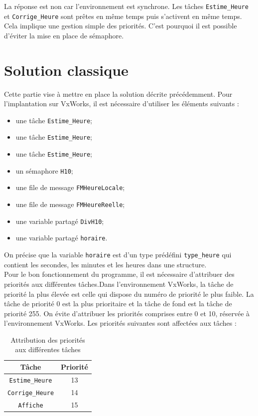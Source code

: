 \documentclass[french]{article}
\begin{document}
	La réponse est non car l'environnement est synchrone. Les tâches \texttt{Estime\_Heure} et \texttt{Corrige\_Heure} sont prêtes en même temps puis s'activent en même temps. Cela implique une gestion simple des priorités. C'est pourquoi il est possible d'éviter la mise en place de sémaphore.\\
	
	
	
	\section{Solution classique}
	
	Cette partie vise à mettre en place la solution décrite précédemment. Pour l'implantation sur VxWorks, il est nécessaire d'utiliser les éléments suivants :
	\begin{itemize}
		\item une tâche \texttt{Estime\_Heure};
		\item une tâche \texttt{Estime\_Heure};
		\item une tâche \texttt{Estime\_Heure};
		\item un sémaphore \texttt{H10};
		\item une file de message \texttt{FMHeureLocale};
		\item une file de message \texttt{FMHeureReelle};
		\item une variable partagé \texttt{DivH10};
		\item une variable partagé \texttt{horaire}.		
	\end{itemize}
	
	On précise que la variable \texttt{horaire} est d'un type prédéfini \texttt{type\_heure} qui contient les secondes, les minutes et les heures dans une structure.\\
	
	Pour le bon fonctionnement du programme, il est nécessaire d'attribuer des priorités aux différentes tâches.Dans l’environnement	VxWorks, la tâche de priorité la plus élevée est celle qui dispose du numéro de priorité le plus faible. La tâche de priorité 0 est la plus prioritaire et la tâche de fond est la tâche de priorité 255. On évite d’attribuer les priorités comprises entre 0 et 10, réservée à l’environnement VxWorks. Les priorités suivantes sont affectées aux tâches :
	
	\begin{table}[H]
		\centering
		\begin{tabular}{|c|c|}
			\hline
			Tâche & Priorité \\
			\hline
			\texttt{Estime\_Heure} & 13 \\
			\hline
			\texttt{Corrige\_Heure} & 14 \\
			\hline
			\texttt{Affiche} & 15 \\
			\hline
		\end{tabular}
		\caption{Attribution des priorités aux différentes tâches}
		\label{tab:priorite_taches}
	\end{table}
\end{document}
